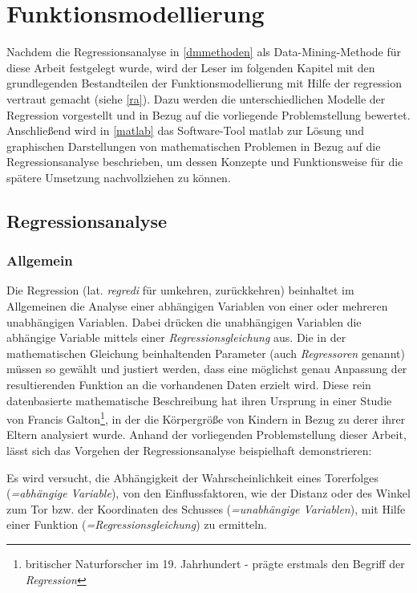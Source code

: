 \section{Funktionsmodellierung}
\label{fm}
Nachdem die Regressionsanalyse in \vref{dmmethoden} als Data-Mining-Methode für diese Arbeit festgelegt wurde, wird der Leser im folgenden Kapitel mit den grundlegenden Bestandteilen der Funktionsmodellierung mit Hilfe der \gls{regression} vertraut gemacht (siehe \vref{ra}). Dazu werden die unterschiedlichen Modelle der Regression vorgestellt und in Bezug auf die vorliegende Problemstellung bewertet. Anschließend wird in \vref{matlab} das Software-Tool \gls{matlab} zur Lösung und graphischen Darstellungen von mathematischen Problemen in Bezug auf die Regressionsanalyse beschrieben, um dessen Konzepte und Funktionsweise für die spätere Umsetzung nachvollziehen zu können.


\subsection{Regressionsanalyse}
\label{ra}
\subsubsection{Allgemein}
Die Regression (lat. \textit{regredi} für umkehren, zurückkehren) beinhaltet im Allgemeinen die Analyse einer abhängigen Variablen von einer oder mehreren unabhängigen Variablen. Dabei drücken die unabhängigen Variablen die abhängige Variable mittels einer \textit{Regressionsgleichung} aus. Die in der mathematischen Gleichung beinhaltenden Parameter (auch \textit{Regressoren} genannt) müssen so gewählt und justiert werden, dass eine möglichst genau Anpassung der resultierenden Funktion an die vorhandenen Daten erzielt wird. Diese rein datenbasierte mathematische Beschreibung hat ihren Ursprung in einer Studie von Francis Galton\footnote{britischer Naturforscher im 19. Jahrhundert - prägte erstmals den Begriff der \textit{Regression}}, in der die Körpergröße von Kindern in Bezug zu derer ihrer Eltern analysiert wurde. Anhand der vorliegenden Problemstellung dieser Arbeit, lässt sich das Vorgehen der Regressionsanalyse beispielhaft demonstrieren:

Es wird versucht, die Abhängigkeit der Wahrscheinlichkeit eines Torerfolges (\textit{=abhängige Variable}), von den Einflussfaktoren, wie der Distanz oder des Winkel zum Tor bzw. der Koordinaten des Schusses (\textit{=unabhängige Variablen}), mit Hilfe einer Funktion (\textit{=Regressionsgleichung}) zu ermitteln. 

